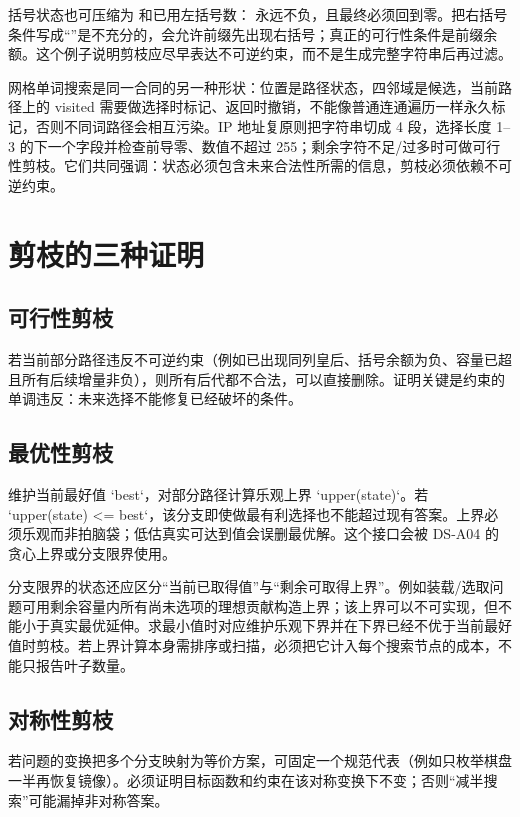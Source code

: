 \documentclass[UTF8,fontset=none,11pt,a4paper]{ctexart}
\begin{document}
括号状态也可压缩为  和已用左括号数： 永远不负，且最终必须回到零。把右括号条件写成“”是不充分的，会允许前缀先出现右括号；真正的可行性条件是前缀余额。这个例子说明剪枝应尽早表达不可逆约束，而不是生成完整字符串后再过滤。

网格单词搜索是同一合同的另一种形状：位置是路径状态，四邻域是候选，当前路径上的 visited 需要做选择时标记、返回时撤销，不能像普通连通遍历一样永久标记，否则不同词路径会相互污染。IP 地址复原则把字符串切成 4 段，选择长度 1--3 的下一个字段并检查前导零、数值不超过 255；剩余字符不足/过多时可做可行性剪枝。它们共同强调：状态必须包含未来合法性所需的信息，剪枝必须依赖不可逆约束。

\section{剪枝的三种证明}

\subsection{可行性剪枝}

若当前部分路径违反不可逆约束（例如已出现同列皇后、括号余额为负、容量已超且所有后续增量非负），则所有后代都不合法，可以直接删除。证明关键是约束的单调违反：未来选择不能修复已经破坏的条件。

\subsection{最优性剪枝}

维护当前最好值 `best`，对部分路径计算乐观上界 `upper(state)`。若 `upper(state) <= best`，该分支即使做最有利选择也不能超过现有答案。上界必须乐观而非拍脑袋；低估真实可达到值会误删最优解。这个接口会被 DS-A04 的贪心上界或分支限界使用。

分支限界的状态还应区分“当前已取得值”与“剩余可取得上界”。例如装载/选取问题可用剩余容量内所有尚未选项的理想贡献构造上界；该上界可以不可实现，但不能小于真实最优延伸。求最小值时对应维护乐观下界并在下界已经不优于当前最好值时剪枝。若上界计算本身需排序或扫描，必须把它计入每个搜索节点的成本，不能只报告叶子数量。

\subsection{对称性剪枝}

若问题的变换把多个分支映射为等价方案，可固定一个规范代表（例如只枚举棋盘一半再恢复镜像）。必须证明目标函数和约束在该对称变换下不变；否则“减半搜索”可能漏掉非对称答案。
\end{document}
